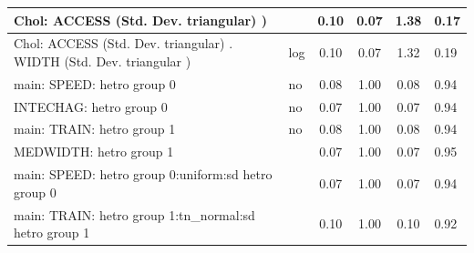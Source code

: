 \begin{table}
\begin{center}
\begin{tabular}{|l|l|c|c|c|l|}
			\hline
			 Chol: ACCESS (Std. Dev. triangular) ) &  & 0.10 & 0.07 & 1.38 & 0.17 \\
			\hline
			 Chol: ACCESS (Std. Dev. triangular) . WIDTH (Std. Dev.   triangular ) & log & 0.10 & 0.07 & 1.32 & 0.19 \\
			\hline
			main: SPEED: hetro group 0 & no & 0.08 & 1.00 & 0.08 & 0.94 \\
			\hline
			INTECHAG: hetro group 0 & no & 0.07 & 1.00 & 0.07 & 0.94 \\
			\hline
			main: TRAIN: hetro group 1 & no & 0.08 & 1.00 & 0.08 & 0.94 \\
			\hline
			MEDWIDTH: hetro group 1 &  & 0.07 & 1.00 & 0.07 & 0.95 \\
			\hline
			main: SPEED: hetro group 0:uniform:sd  hetro group 0 &  & 0.07 & 1.00 & 0.07 & 0.94 \\
			\hline
			main: TRAIN: hetro group 1:tn_normal:sd  hetro group 1 &  & 0.10 & 1.00 & 0.10 & 0.92 \\
			\hline
		\end{tabular}
	\end{center}
\end{table}